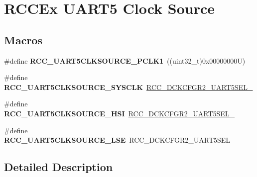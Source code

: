 \hypertarget{group___r_c_c_ex___u_a_r_t5___clock___source}{}\section{R\+C\+C\+Ex U\+A\+R\+T5 Clock Source}
\label{group___r_c_c_ex___u_a_r_t5___clock___source}
\subsection*{Macros}
\begin{DoxyCompactItemize}
\item 
\mbox{\label{group___r_c_c_ex___u_a_r_t5___clock___source_ga11924edfaf7870ecf910ce751863254e}} 
\#define {\bfseries R\+C\+C\+\_\+\+U\+A\+R\+T5\+C\+L\+K\+S\+O\+U\+R\+C\+E\+\_\+\+P\+C\+L\+K1}~((uint32\+\_\+t)0x00000000\+U)
\item 
\mbox{\label{group___r_c_c_ex___u_a_r_t5___clock___source_gaf703f61ac42f329c33891e89ffe4e0bc}} 
\#define {\bfseries R\+C\+C\+\_\+\+U\+A\+R\+T5\+C\+L\+K\+S\+O\+U\+R\+C\+E\+\_\+\+S\+Y\+S\+C\+LK}~\mbox{\hyperlink{group___peripheral___registers___bits___definition_ga0949f29b95ec27c43a348ee3d520debc}{R\+C\+C\+\_\+\+D\+C\+K\+C\+F\+G\+R2\+\_\+\+U\+A\+R\+T5\+S\+E\+L\+\_}}
\item 
\mbox{\label{group___r_c_c_ex___u_a_r_t5___clock___source_ga04b78012371f9aa8e9993fdcec09142c}} 
\#define {\bfseries R\+C\+C\+\_\+\+U\+A\+R\+T5\+C\+L\+K\+S\+O\+U\+R\+C\+E\+\_\+\+H\+SI}~\mbox{\hyperlink{group___peripheral___registers___bits___definition_gaeb032fc770134eab63af20399ad08aa2}{R\+C\+C\+\_\+\+D\+C\+K\+C\+F\+G\+R2\+\_\+\+U\+A\+R\+T5\+S\+E\+L\+\_}}
\item 
\mbox{\label{group___r_c_c_ex___u_a_r_t5___clock___source_gadc9f986ea62a5adb4fa6777fd9d7219a}} 
\#define {\bfseries R\+C\+C\+\_\+\+U\+A\+R\+T5\+C\+L\+K\+S\+O\+U\+R\+C\+E\+\_\+\+L\+SE}~R\+C\+C\+\_\+\+D\+C\+K\+C\+F\+G\+R2\+\_\+\+U\+A\+R\+T5\+S\+EL
\end{DoxyCompactItemize}


\subsection{Detailed Description}
